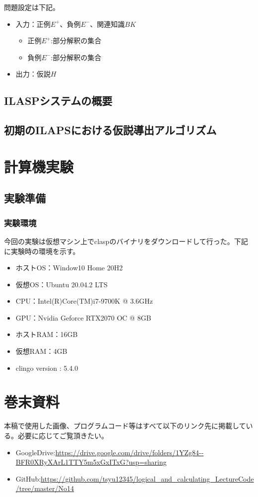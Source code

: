 \documentclass[dvipdfmx]{jsarticle}
\begin{document}
問題設定は下記。
\begin{itemize}
  \item 入力：正例$E^+$、負例$E^-$、関連知識$BK$ \par
  \begin{itemize}
    \item 正例$E^+$:部分解釈の集合
    \item 負例$E^-$:部分解釈の集合
  \end{itemize}
  \item 出力：仮説$H$\par

\end{itemize}

\subsection{ILASPシステムの概要}
\subsection{初期のILAPSにおける仮説導出アルゴリズム}

\section{計算機実験}
\subsection{実験準備}
  \subsubsection{実験環境}
  今回の実験は仮想マシン上でclaspのバイナリをダウンロードして行った。下記に実験時の環境を示す。
  \begin{itemize}
    \item ホストOS：Window10 Home 20H2
    \item 仮想OS：Ubuntu 20.04.2 LTS
    \item CPU：Intel(R)Core(TM)i7-9700K @ 3.6GHz
    \item GPU：Nvidia Geforce RTX2070 OC @ 8GB
    \item ホストRAM：16GB
    \item 仮想RAM：4GB
    \item clingo version : 5.4.0
  \end{itemize}

\section{巻末資料}
  本稿で使用した画像、プログラムコード等はすべて以下のリンク先に掲載している。必要に応じてご覧頂きたい。
  \begin{itemize}
    \item GoogleDrive:\url{https://drive.google.com/drive/folders/1YZg84--BFR0XRyXArL1TTY5m5xGxITxG?usp=sharing}
    \item GitHub:\url{https://github.com/tsyu12345/logical_and_calculating_LectureCode/tree/master/No14}
  \end{itemize}
\end{document}
